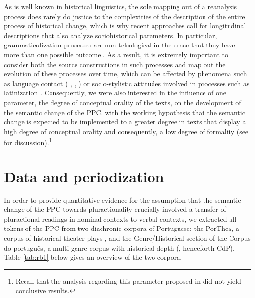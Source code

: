 \documentclass[output=paper,colorlinks,citecolor=brown]{langscibook}
\begin{document}
As is well known in historical linguistics, the sole mapping out of a reanalysis process does rarely do justice to the complexities of the description of the entire process of historical change, which is why recent approaches call for longitudinal descriptions that also analyze sociohistorical parameters. In particular, grammaticalization processes are non-teleological in the sense that they have more than one possible outcome \parencite{Collins2019}. As a result, it is extremely important to consider both the source constructions in such processes \parencite{Cristofaro2019} and map out the evolution of these processes over time, which can be affected by phenomena such as language contact (\citeauthor{Thomason2010} \citeyear{Thomason2010}, \citeauthor{PoplackDion2011} \citeyear{PoplackDion2011}, \citeauthor{AuweraGast2012} \citeyear{AuweraGast2012}) or socio-stylistic attitudes involved in processes such as latinization \parencite{Cornillie2019}. Consequently, we were also interested in the influence of one parameter, the degree of conceptual orality of the texts, on the development of the semantic change of the PPC, with the working hypothesis that the semantic change is expected to be implemented to a greater degree in texts that display a high degree of conceptual orality and consequently, a low degree of formality (see \citeauthor{Rosemeyer2019a} \citeyear{Rosemeyer2019a} for discussion).\footnote{Recall that the analysis regarding this parameter proposed in \citet{Barbosa2014} did not yield conclusive results.}  

\section{Data and periodization}\label{sec:rb3}

In order to provide quantitative evidence for the assumption that the semantic change of the PPC towards pluractionality crucially involved a transfer of pluractional readings in nominal contexts to verbal contexts, we extracted all tokens of the PPC from two diachronic corpora of Portuguese: the PorThea, a corpus of historical theater plays \parencite{Rosemeyer2019b}, and the Genre/Historical section of the Corpus do português, a multi-genre corpus with historical depth (\cite{Davies2016P}, henceforth CdP). Table \ref{tab:rb1} below gives an overview of the two corpora.\largerpage
\end{document}
